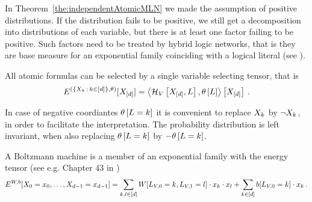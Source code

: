 
In Theorem~\ref{the:independentAtomicMLN} we made the assumption of positive distributions.
If the distribution fails to be positive, we still get a decomposition into distributions of each variable, but there is at least one factor failing to be positive.
Such factors need to be treated by hybrid logic networks, that is they are base measure for an exponential family coinciding with a logical literal (see ).

All atomic formulas can be selected by a single variable selecting tensor, that is
	\[ E^{(\{X_{k} \, : \, k\in[d]\},\theta)}[X_{[d]}]
	= \left\langle \mathcal{H}_{V}\left[X_{[d]},L\right],\theta\left[L\right]\right\rangle \left[ X_{[d]} \right] \, . 
	\]
	
In case of negative coordiantes $\theta\left[L=k\right]$ it is convenient to replace $X_{k}$ by $\lnot X_{k}$, in order to facilitate the interpretation.
The probability distribution is left invariant, when also replacing $\theta\left[L=k\right]$ by $-\theta\left[L=k\right]$.





A Boltzmann machine is a member of an exponential family with the energy tensor (see e.g. Chapter 43 in \cite{mackay_information_2003})
	\[ E^{W,b}[X_{0}=x_{0},\ldots,X_{d-1}=x_{d-1}] = 
	\sum_{k,l \in [d]} 
		W[L_{V,0}=k, L_{V,1}=l] \cdot x_{k} \cdot x_{l} 
	+ \sum_{k\in[d]} b[L_{V,0}=k] \cdot x_{k}\, . \]



